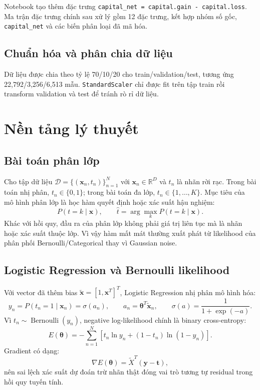 \documentclass[12pt,a4paper]{article}
\begin{document}
Notebook tạo thêm đặc trưng \texttt{capital\_net = capital.gain - capital.loss}. Ma trận đặc trưng chính sau xử lý gồm 12 đặc trưng, kết hợp nhóm số gốc, \texttt{capital\_net} và các biến phân loại đã mã hóa.

\subsection{Chuẩn hóa và phân chia dữ liệu}

Dữ liệu được chia theo tỷ lệ 70/10/20 cho train/validation/test, tương ứng 22,792/3,256/6,513 mẫu. \texttt{StandardScaler} chỉ được fit trên tập train rồi transform validation và test để tránh rò rỉ dữ liệu.

\section{Nền tảng lý thuyết}
\label{sec:cls_theory}

\subsection{Bài toán phân lớp}

Cho tập dữ liệu $\mathcal{D}=\{(\mathbf{x}_n,t_n)\}_{n=1}^{N}$ với
$\mathbf{x}_n\in\mathbb{R}^{D}$ và $t_n$ là nhãn rời rạc. Trong bài toán nhị phân,
$t_n\in\{0,1\}$; trong bài toán đa lớp, $t_n\in\{1,\ldots,K\}$. Mục tiêu của mô
hình phân lớp là học hàm quyết định hoặc xác suất hậu nghiệm:
\begin{equation}
  P(t=k\mid \mathbf{x}), \qquad
  \hat{t}=\arg\max_{k}P(t=k\mid \mathbf{x}).
  \label{eq:cls_posterior}
\end{equation}
Khác với hồi quy, đầu ra của phân lớp không phải giá trị liên tục mà là nhãn hoặc
xác suất thuộc lớp. Vì vậy hàm mất mát thường xuất phát từ likelihood của phân
phối Bernoulli/Categorical thay vì Gaussian noise.

\subsection{Logistic Regression và Bernoulli likelihood}

Với vector đã thêm bias $\tilde{\mathbf{x}}=[1,\mathbf{x}^{T}]^{T}$, Logistic
Regression nhị phân mô hình hóa:
\begin{equation}
  y_n=P(t_n=1\mid \mathbf{x}_n)=\sigma(a_n),
  \qquad
  a_n=\boldsymbol{\theta}^{T}\tilde{\mathbf{x}}_n,
  \qquad
  \sigma(a)=\frac{1}{1+\exp(-a)}.
  \label{eq:cls_logistic_model}
\end{equation}
Vì $t_n\sim\operatorname{Bernoulli}(y_n)$, negative log-likelihood chính là
binary cross-entropy:
\begin{equation}
  E(\boldsymbol{\theta})
  =-\sum_{n=1}^{N}\left[t_n\ln y_n+(1-t_n)\ln(1-y_n)\right].
  \label{eq:cls_bce}
\end{equation}
Gradient có dạng:
\begin{equation}
  \nabla E(\boldsymbol{\theta})=\tilde{X}^{T}(\mathbf{y}-\mathbf{t}),
  \label{eq:cls_logistic_gradient}
\end{equation}
nên sai lệch xác suất dự đoán trừ nhãn thật đóng vai trò tương tự residual trong
hồi quy tuyến tính.
\end{document}

